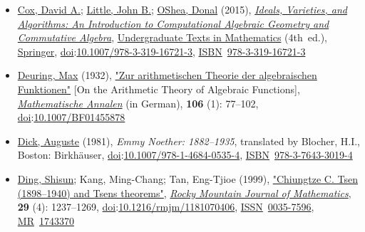 \begin{itemize}
\item
  \href{https://en.wikipedia.org/wiki/David_A._Cox}{Cox, David A.}; \href{https://en.wikipedia.org/wiki/John_B._Little_(mathematician)}{Little, John B.}; \href{https://en.wikipedia.org/wiki/Donal_O'Shea}{O\textquotesingle Shea, Donal} (2015), \href{https://link.springer.com/book/10.1007/978-3-319-16721-3}{\emph{Ideals, Varieties, and Algorithms: An Introduction to Computational Algebraic Geometry and Commutative Algebra}}, \href{https://en.wikipedia.org/wiki/Undergraduate_Texts_in_Mathematics}{Undergraduate Texts in Mathematics} (4th{~}ed.), \href{https://en.wikipedia.org/wiki/Springer_Verlag}{Springer}, \href{https://en.wikipedia.org/wiki/Doi_(identifier)}{doi}:\href{https://doi.org/10.1007\%2F978-3-319-16721-3}{10.1007/978-3-319-16721-3}, \href{https://en.wikipedia.org/wiki/ISBN_(identifier)}{ISBN}{~}\href{https://en.wikipedia.org/wiki/Special:BookSources/978-3-319-16721-3}{978-3-319-16721-3}{}
\item
  \href{https://en.wikipedia.org/wiki/Max_Deuring}{Deuring, Max} (1932), \href{https://gdz.sub.uni-goettingen.de/id/PPN235181684_0106}{"Zur arithmetischen Theorie der algebraischen Funktionen"} {{[}}On the Arithmetic Theory of Algebraic Functions{{]}}, \emph{\href{https://en.wikipedia.org/wiki/Mathematische_Annalen}{Mathematische Annalen}} (in German), \textbf{106} (1): {77--}102, \href{https://en.wikipedia.org/wiki/Doi_(identifier)}{doi}:\href{https://doi.org/10.1007\%2FBF01455878}{10.1007/BF01455878}{}
\item
  \href{https://en.wikipedia.org/wiki/Auguste_Dick}{Dick, Auguste} (1981), \emph{Emmy Noether: 1882--1935}, translated by Blocher, H.I., Boston: Birkhäuser, \href{https://en.wikipedia.org/wiki/Doi_(identifier)}{doi}:\href{https://doi.org/10.1007\%2F978-1-4684-0535-4}{10.1007/978-1-4684-0535-4}, \href{https://en.wikipedia.org/wiki/ISBN_(identifier)}{ISBN}{~}\href{https://en.wikipedia.org/wiki/Special:BookSources/978-3-7643-3019-4}{978-3-7643-3019-4}{}
\item
  \href{https://en.wikipedia.org/wiki/Ding_Shisun}{Ding, Shisun}; Kang, Ming-Chang; Tan, Eng-Tjioe (1999), \href{https://projecteuclid.org/euclid.rmjm/1181070406}{"Chiungtze C. Tsen (1898--1940) and Tsen\textquotesingle s theorems"}, \emph{\href{https://en.wikipedia.org/wiki/Rocky_Mountain_Journal_of_Mathematics}{Rocky Mountain Journal of Mathematics}}, \textbf{29} (4): {1237--}1269, \href{https://en.wikipedia.org/wiki/Doi_(identifier)}{doi}:{\href{https://doi.org/10.1216\%2Frmjm\%2F1181070406}{10.1216/rmjm/1181070406}}, \href{https://en.wikipedia.org/wiki/ISSN_(identifier)}{ISSN}{~}\href{https://search.worldcat.org/issn/0035-7596}{0035-7596}, \href{https://en.wikipedia.org/wiki/MR_(identifier)}{MR}{~}\href{https://mathscinet.ams.org/mathscinet-getitem?mr=1743370}{1743370}{}

\end{itemize}
